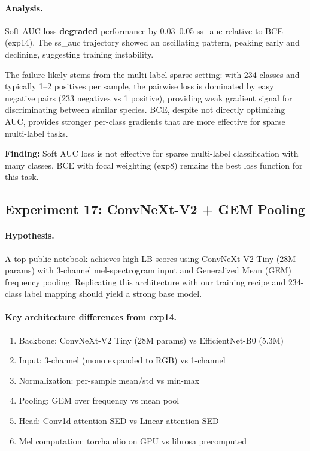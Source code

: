 \paragraph{Analysis.}
Soft AUC loss \textbf{degraded} performance by 0.03--0.05 ss\_auc relative
to BCE (exp14). The ss\_auc trajectory showed an oscillating pattern, peaking
early and declining, suggesting training instability.

The failure likely stems from the multi-label sparse setting: with 234 classes
and typically 1--2 positives per sample, the pairwise loss is dominated by
easy negative pairs (233 negatives vs 1 positive), providing weak gradient
signal for discriminating between similar species. BCE, despite not directly
optimizing AUC, provides stronger per-class gradients that are more effective
for sparse multi-label tasks.

\textbf{Finding:} Soft AUC loss is not effective for sparse multi-label
classification with many classes. BCE with focal weighting (exp8) remains
the best loss function for this task.

\subsection{Experiment 17: ConvNeXt-V2 + GEM Pooling}
\label{sec:exp17}

\paragraph{Hypothesis.}
A top public notebook achieves high LB scores using ConvNeXt-V2 Tiny
(28M params) with 3-channel mel-spectrogram input and Generalized Mean (GEM)
frequency pooling. Replicating this architecture with our training recipe
and 234-class label mapping should yield a strong base model.

\paragraph{Key architecture differences from exp14.}
\begin{enumerate}
    \item Backbone: ConvNeXt-V2 Tiny (28M params) vs EfficientNet-B0 (5.3M)
    \item Input: 3-channel (mono expanded to RGB) vs 1-channel
    \item Normalization: per-sample mean/std vs min-max
    \item Pooling: GEM over frequency vs mean pool
    \item Head: Conv1d attention SED vs Linear attention SED
    \item Mel computation: torchaudio on GPU vs librosa precomputed
\end{enumerate}

